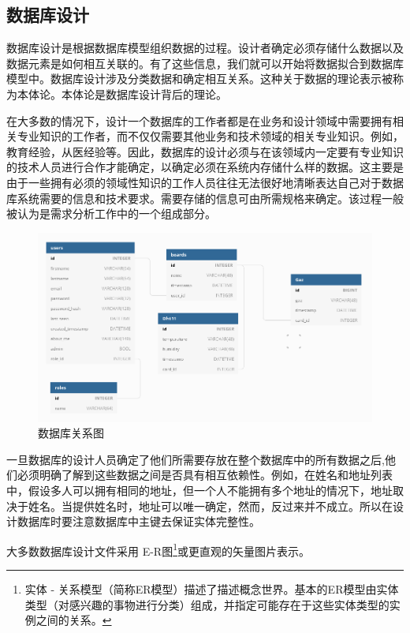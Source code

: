\subsection{数据库设计}

数据库设计是根据数据库模型组织数据的过程。设计者确定必须存储什么数据以及数据元素是如何相互关联的。有了这些信息，我们就可以开始将数据拟合到数据库模型中。数据库设计涉及分类数据和确定相互关系。这种关于数据的理论表示被称为本体论。本体论是数据库设计背后的理论。

在大多数的情况下，设计一个数据库的工作者都是在业务和设计领域中需要拥有相关专业知识的工作者，而不仅仅需要其他业务和技术领域的相关专业知识。例如，教育经验，从医经验等。因此，数据库的设计必须与在该领域内一定要有专业知识的技术人员进行合作才能确定，以确定必须在系统内存储什么样的数据。这主要是由于一些拥有必须的领域性知识的工作人员往往无法很好地清晰表达自己对于数据库系统需要的信息和技术要求。需要存储的信息可由所需规格来确定。该过程一般被认为是需求分析工作中的一个组成部分。

\begin{figure}[htbp]
	\centering
	\includegraphics[width=1\linewidth]{figure/2-7}
	\caption{数据库关系图}
	\label{fig:2-7}
\end{figure}

一旦数据库的设计人员确定了他们所需要存放在整个数据库中的所有数据之后,他们必须明确了解到这些数据之间是否具有相互依赖性。例如，在姓名和地址列表中，假设多人可以拥有相同的地址，但一个人不能拥有多个地址的情况下，地址取决于姓名。当提供姓名时，地址可以唯一确定，然而，反过来并不成立。所以在设计数据库时要注意数据库中主键去保证实体完整性。

大多数数据库设计文件采用 
E-R图\footnote{实体 - 关系模型（简称ER模型）描述了描述概念世界。基本的ER模型由实体类型（对感兴趣的事物进行分类）组成，并指定可能存在于这些实体类型的实例之间的关系。}或更直观的矢量图片表示。

